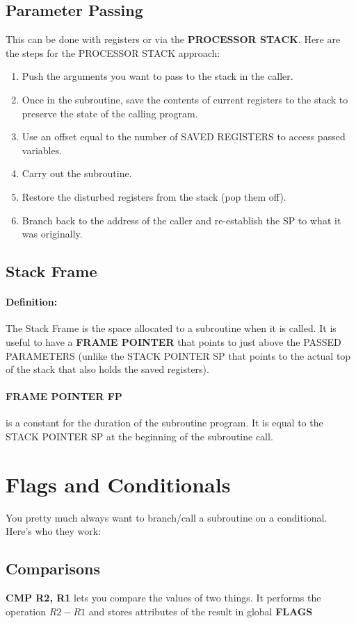 \documentclass[a4paper,12pt]{report}
\begin{document}
\subsection{Parameter Passing}
This can be done with registers or via the \textbf{PROCESSOR STACK}. Here are the steps for the PROCESSOR STACK approach:
\begin{enumerate}
\item Push the arguments you want to pass to the stack in the caller.
\item Once in the subroutine, save the contents of current registers to the stack to preserve the state of the calling program.
\item Use an offset equal to the number of SAVED REGISTERS to access passed variables.
\item Carry out the subroutine.
\item Restore the disturbed registers from the stack (pop them off).
\item Branch back to the address of the caller and re-establish the SP to what it was originally.
\end{enumerate}

\subsection{Stack Frame}
\paragraph{Definition: } The Stack Frame is the space allocated to a subroutine when it is called. It is useful to 
have a \textbf{FRAME POINTER} that points to just above the PASSED PARAMETERS (unlike the STACK POINTER SP that points 
to the actual top of the stack that also holds the saved registers). 

\paragraph{FRAME POINTER FP } is a constant for the duration of the subroutine program. It is equal to the STACK POINTER SP 
at the beginning of the subroutine call.

\section{Flags and Conditionals}
You pretty much always want to branch/call a subroutine on a conditional. Here's who they work:
\subsection{Comparisons}
\textbf{CMP R2, R1} lets you compare the values of two things. It performs the operation $R2 - R1$ and stores attributes of the result in global \textbf{FLAGS}
\end{document}
